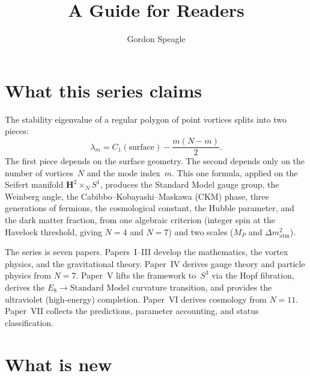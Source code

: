 

\title{\seriestitle\\[6pt]\large A Guide for Readers}
\author{Gordon Speagle}
\date{}


\maketitle

\section{What this series claims}

The stability eigenvalue of a regular polygon of point vortices
splits into two pieces:
\begin{equation}\label{eq:central}
  \lambda_m = C_1(\text{surface}) - \frac{m(N{-}m)}{2}.
\end{equation}
The first piece depends on the surface geometry.
The second depends only on the number of vortices~$N$ and the
mode index~$m$.
This one formula, applied on the Seifert manifold
$\mathbf{H}^2 \times_N S^1$, produces
the Standard Model gauge group, the Weinberg angle,
the Cabibbo--Kobayashi--Maskawa (CKM) phase, three generations of fermions,
the cosmological constant, the Hubble parameter,
and the dark matter fraction, from one algebraic criterion
(integer spin at the Havelock threshold, giving $N = 4$ and $N = 7$)
and two scales ($M_P$ and $\Delta m^2_{\mathrm{atm}}$).

The series is seven papers.
Papers~I--III develop the mathematics, the vortex physics,
and the gravitational theory.
Paper~IV derives gauge theory and particle physics from $N = 7$.
Paper~V lifts the framework to~$S^3$ via the Hopf fibration,
derives the $E_8 \to \text{Standard Model}$ curvature transition,
and provides the ultraviolet (high-energy) completion.
Paper~VI derives cosmology from $N = 11$.
Paper~VII collects the predictions, parameter accounting,
and status classification.

\section{What is new}


